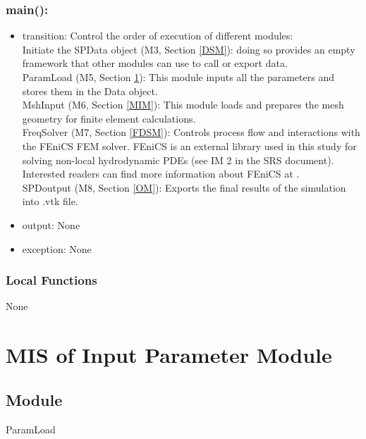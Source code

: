 \documentclass[12pt, titlepage]{article}
\begin{document}
	\subsubsection*{main():} \begin{itemize} \item transition: Control the order of execution of different modules:\\
		\subitem Initiate the SPData object (M3, Section \ref{DSM}): doing so provides an empty framework that other modules can use to call or export data. \\ 
		\subitem ParamLoad (M5, Section \ref{IPM}): This module inputs all the parameters and stores them in the Data object.\\
		
		\subitem MshInput (M6, Section \ref{MIM}): This module loads and prepares the mesh geometry for finite
		element calculations.\\
		
		\subitem FreqSolver (M7, Section \ref{FDSM}): Controls process flow and interactions with the FEniCS FEM solver. FEniCS is an external library used in this study for solving
		non-local hydrodynamic PDEs (see IM 2 in the SRS document). Interested readers
		can find more information about FEniCS at
		\cite{alnaes2015fenics,logg2012finite}.\\
		
		\subitem SPDoutput (M8, Section \ref{OM}): Exports the final results of the simulation into .vtk file.
		
		\item output: None \item exception: None \end{itemize}
	
	
	\subsubsection{Local Functions}
	
	None
	
	\newpage %
	\section{MIS of Input Parameter Module} \label{IPM}
	
	\subsection{Module} ParamLoad
	
\end{document}

